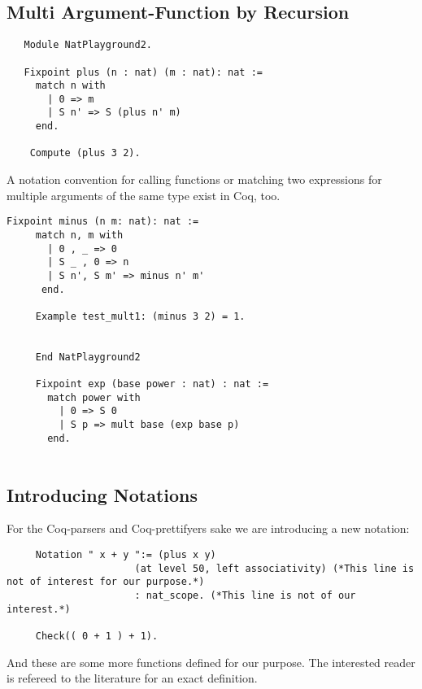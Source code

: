    \subsection{Multi Argument-Function by Recursion}
   
   \begin{lstlisting}
   Module NatPlayground2.
   
   Fixpoint plus (n : nat) (m : nat): nat :=
     match n with
       | 0 => m
       | S n' => S (plus n' m)
     end.
     
    Compute (plus 3 2). 
   \end{lstlisting}   
    A notation convention for calling functions or matching two expressions for multiple arguments of the same type exist in Coq, too.
   
   \begin{lstlisting}[label = lst:minus_nat, caption={ \lstinline!minus! and \lstinline!exp!}]
    Fixpoint minus (n m: nat): nat :=
     match n, m with
       | 0 , _ => 0
       | S _ , 0 => n
       | S n', S m' => minus n' m'
      end.
      
     Example test_mult1: (minus 3 2) = 1.
     
      
     End NatPlayground2
     
     Fixpoint exp (base power : nat) : nat :=
       match power with
         | 0 => S 0
         | S p => mult base (exp base p)
       end.
         
   \end{lstlisting}
        
   \subsection{Introducing Notations}


    For the Coq-parsers and Coq-prettifyers sake we are introducing a new notation:
    
    \begin{lstlisting}
     Notation " x + y ":= (plus x y)
                      (at level 50, left associativity) (*This line is not of interest for our purpose.*)
                      : nat_scope. (*This line is not of our interest.*)
                      
     Check(( 0 + 1 ) + 1).
    \end{lstlisting}    
   And these are some more functions defined for our purpose. 
   The interested reader is refereed to the literature for an exact definition.  
   
